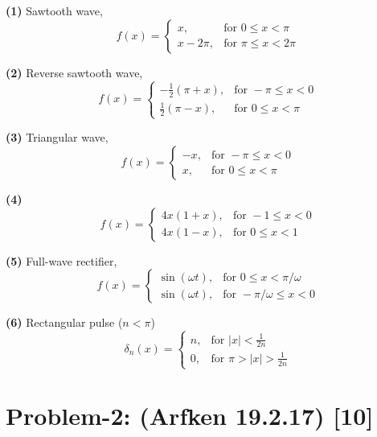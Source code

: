 \documentclass[12pt, a4paper]{article}
\begin{document}
\textbf{(1)} Sawtooth wave, \[ f(x) =
\begin{cases} 
x, & \text{for } 0\leq x < \pi \\
x-2\pi, & \text{for } \pi\leq x <2\pi
\end{cases}
\] 

\textbf{(2)} Reverse sawtooth wave, \[ f(x) =
\begin{cases} 
-\frac{1}{2}(\pi+x), & \text{for } -\pi\leq x < 0 \\
\frac{1}{2}(\pi-x), & \text{for } 0\leq x <\pi
\end{cases}
\] 

\textbf{(3)} Triangular wave, \[ f(x) =
\begin{cases} 
-x, & \text{for } -\pi\leq x < 0 \\
x, & \text{for } 0\leq x <\pi
\end{cases}
\] 

\textbf{(4)} \[ f(x) =
\begin{cases} 
4x(1+x), & \text{for } -1\leq x < 0 \\
4x(1-x), & \text{for } 0\leq x <1
\end{cases}
\] 

\textbf{(5)} Full-wave rectifier, \[ f(x) =
\begin{cases} 
\sin(\omega t), & \text{for } 0 \leq x < \pi/ \omega \\
\sin(\omega t), & \text{for } -\pi/\omega \leq x < 0
\end{cases}
\] 

\textbf{(6)} Rectangular pulse ($n<\pi$)\[ \delta_n(x) =
\begin{cases} 
n, & \text{for } |x| < \frac{1}{2n} \\
0, & \text{for } \pi > |x| > \frac{1}{2n}
\end{cases}
\] 

\section*{Problem-2: (Arfken 19.2.17) \hfill \textbf{[10]}}
\end{document}
